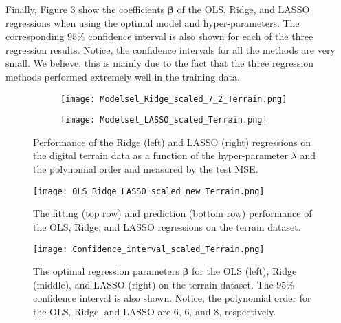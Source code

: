 \documentclass[a4paper]{article}
\begin{document}
Finally, Figure \ref{Confidence_interval_scaled_Terrain} show the coefficients $\mathbf{\beta}$ of the OLS, Ridge, and LASSO regressions when using the optimal model and hyper-parameters. The corresponding $95\%$ confidence interval is also shown for each of the three regression results. Notice, the confidence intervals for all the methods are very small. We believe, this is mainly due to the fact that the three regression methods performed extremely well in the training data.

\begin{figure}[ht]
     \centering
     \begin{subfigure}{.475\textwidth}
         \centering
         \texttt{[image: Modelsel\_Ridge\_scaled\_7\_2\_Terrain.png]}
     \end{subfigure}
     \begin{subfigure}{.475\textwidth}
         \centering
         \texttt{[image: Modelsel\_LASSO\_scaled\_Terrain.png]}
     \end{subfigure}
    \caption{Performance of the Ridge (left) and LASSO (right) regressions on the digital terrain data as a function of the hyper-parameter $\lambda$ and the polynomial order and measured by the test MSE.}
    \label{Modelsel_Ridge_LASSO_scaled_Terrain}
\end{figure}

\begin{figure}[H]
  \centering
  \texttt{[image: OLS\_Ridge\_LASSO\_scaled\_new\_Terrain.png]}
  \caption{The fitting (top row) and prediction (bottom row) performance of the OLS, Ridge, and LASSO regressions on the terrain dataset.}
    \label{OLS_Ridge_LASSO_degree8_Terrain}
\end{figure}

\begin{figure}[H]
  \centering
  \texttt{[image: Confidence\_interval\_scaled\_Terrain.png]}
  \caption{The optimal regression parameters $\mathbf{\beta}$ for the OLS (left), Ridge (middle), and LASSO (right) on the terrain dataset. The $95\%$ confidence interval is also shown. Notice, the polynomial order for the OLS, Ridge, and LASSO are $6$, $6$, and $8$, respectively.}
    \label{Confidence_interval_scaled_Terrain}
\end{figure}
\end{document}
